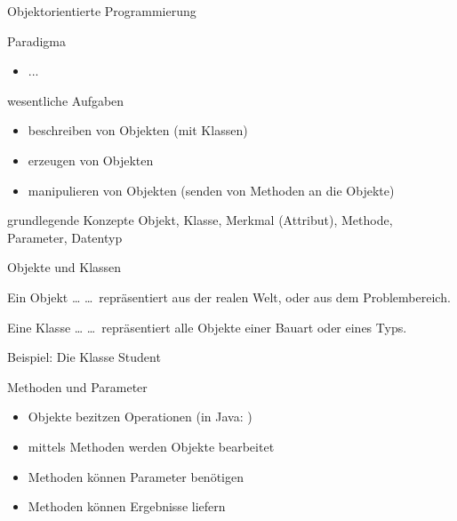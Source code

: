 \begin{frame}{Objektorientierte Programmierung}
    \begin{block}{Paradigma}
        \begin{itemize}
        \item ...
        \end{itemize}
    \end{block}

    \begin{block}{wesentliche Aufgaben}
        \begin{itemize}
        \item \color{wings}beschreiben \color{black}von Objekten (mit Klassen)
        \item \color{wings}erzeugen \color{black}von Objekten
        \item \color{wings}manipulieren \color{black}von Objekten (\color{wings}senden \color{black}von Methoden an die Objekte)
        \end{itemize}
    \end{block}

    \begin{block}{grundlegende Konzepte}
        Objekt, Klasse, Merkmal (Attribut), Methode, Parameter, Datentyp
    \end{block}
\end{frame}

\begin{frame}{Objekte und Klassen}
    \begin{block}{Ein Objekt \ldots}
    \ldots\ repräsentiert  aus der realen Welt, oder aus dem Problembereich.
    \end{block}

    \begin{block}{Eine Klasse \ldots}
    \ldots\ repräsentiert alle Objekte einer Bauart oder eines Typs.
    \end{block}
\end{frame}

\begin{frame}[shrink]{Beispiel: Die Klasse Student}
    
\end{frame}

\begin{frame}{Methoden und Parameter}
    \begin{itemize}
    \item Objekte bezitzen Operationen (in Java: )
    \item mittels Methoden werden Objekte bearbeitet
    \item Methoden können Parameter benötigen
    \item Methoden können Ergebnisse liefern
    \end{itemize}
\end{frame}


